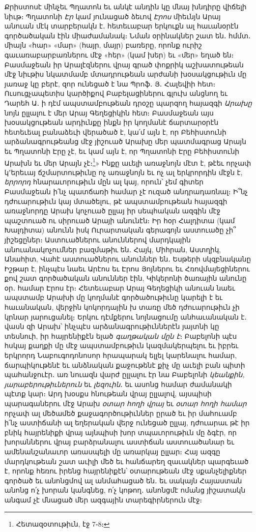 \documentclass{article}
\begin{document}
{Քրիստոսէ մինչեւ Պղատոն եւ անկէ անդին կը մնայ խնդիրը վիճելի նիւթ։ Պղատոնի \emph{Էր} կամ յունացած ձեւով \emph{Էրոս} միեւնյն Արայ անուան մէկ տարբերակն է․ հետեւաբար երկուքն ալ հաւանօրէն գործածական էին միաժամանակ։ Նման օրինակներ շատ են․ հմմտ․ միայն «հար» «մար» (հայր, մայր) բառերը, որոնք ուրիշ գաւառաբարբառներու մէջ «հեր» (կամ խեր) եւ «մեր» եղած են։ Բասմաջեան իր Արալէզներու վրայ գրած փոքրիկ աշխատութեան մէջ նիւթիս նկատմամբ մտադրութեան արժանի խօսակցութիւն մը յառաջ կը բերէ, զոր ունեցած է նա Պրոֆ․ Յ․ Հալեվիի հետ։ Ուսուցչապետիս կարծիքով Բաբելացիներու գլուխ անցնող եւ Դարեհ Ա․ ի դէմ ապստամբութեան դրօշը պարզող հայազգի \emph{Արախը} նոյն ըլլալու է մեր Արայ Գեղեցիկին հետ։ Բասմաջեան այս խօսակցութեան արդիւնքը ինքն իր կողմանէ ճարտարօրէն հետեւեալ բանաձեւի վերածած է, կա՛մ այն է, որ Բեհիստունի արձանագրութեանց մէջ յիշուած Արախը մեր պատմագրաց Արայն եւ Պղատոնի Էրը չէ, եւ կամ այն է, որ Պղատոնի Էրը Բեհիստունի Արախն եւ մեր Արայն չէ։\footnote{Հետազօտութիւն, էջ 7֊8։ }» Ինքը աւելի առաջնոյն մէտ է, թէեւ որչափ կ՚երեւայ ճշմարտութիւնը ոչ առաջնոյն եւ ոչ ալ երկրորդին մէջն է, \emph{երրորդ} հնարաւորութիւն մըն ալ կայ, որուն՝ չեմ գիտեր Բասմաջեան ի՛նչ պատճառի համար չէ ուզած անդրադառնալ։ Ի՞նչ դժուարութիւն կայ մտածելու, թէ ապստամբութեան հայազգի առաջնորդը Արախ կոչուած ըլլայ իր սեպհական ազգին մէջ պաշտուած ու սիրուած Արայի անունէն։ Իր հօր Հալդիտա (կամ Խալդիտա) անունն իսկ Ուրարտական գերագոյն աստուածը չի՞ յիշեցըներ։ Աստուածներու անուններով մարդկային անուանակոչումներ բազմաթիւ են․ Հայկ, Միհրան, Աստղիկ, Անահիտ, Վահէ աստուածներու անուններ են․ Եսթերի սկզբնականը Իշթար է, ինչպէս նաեւ Արէոս եւ Էրոս Յոյներու եւ Հռովմայեցիներու քով շատ գործածական անուններ էին, Կիկերոնի ծառային անունը օր․ համար Էրոս էր։ Հետեւաբար Արայ Գեղեցիկի անուան նաեւ ապստամբ Արախի մը կողմանէ գործածութիւնը կարելի է եւ հաւանական, վերջին կոկորդային խ տառը մեծ դժուարութիւն չի կրնար յարուցանել։ Երկու դէմքերու նոյնացումը անհաւանական է․ վասն զի Արախ՝ ինչպէս արձանագրութիւններէն յայտնի կը տեսնուի, իր հայրենիքէն ելած \emph{գաղթական մըն է}։ Բաբելոնի պէս հսկայ քաղքի մը մէջ ապստամբութիւն կազմակերպելու եւ իբրեւ երկրորդ Նաբուգոդոնոսոր հրապարակ ելլել կարենալու համար, ճարպիկութենէ եւ անձնական քաջութենէ քիչ մը աւելի բան պիտի պահանջուէր․ առ նուազն վարժ ըլլալու էր նա Բաբելոնի \emph{կեանքին, յարաբերութիւներուն} եւ \emph{լեզուին․} եւ ասոնց համար ժամանակի պէտք կար։ Արդ խօսքս հնութեան վրայ ըլլալով, այսպիսի պարագաներու մէջ Արախ \emph{օտար հողի վրայ} եւ \emph{օտար հողի համար} որչափ ալ մեծամեծ քաջագործութիւններ ըրած եւ իր մահուամբ ի՛նչ աստիճանի ալ եղերական վերջ ունեցած ըլլայ, դժուարաւ թէ իր բնիկ հայրենիքի վրայ այնպիսի խոր տպաւորութիւն մը ձգէր, որ խորաններու վրայ բարձրանալու աստիճան աստուածանար եւ ամենանշանաւոր առասպելի մը առարկայ ըլլար։ Հայ ազգը մարդկութեան շատ աւիլի մեծ եւ հանճարեղ զաւակներ պարգեւած է, որոնք հեռու իրենց հայրենիքէն՝ օտարութեան մէջ սքանչելիքներ գործած եւ անոնցմով ալ անմահացած են․ եւ սակայն Հայաստան անոնց ո՛չ խորան կանգնեց, ո՛չ կոթող․ անոնցմէ ոմանց յիշատակն անգամ չէ մնացած մեր ազգային տարեգիրներուն մէջ։

}
\end{document}
